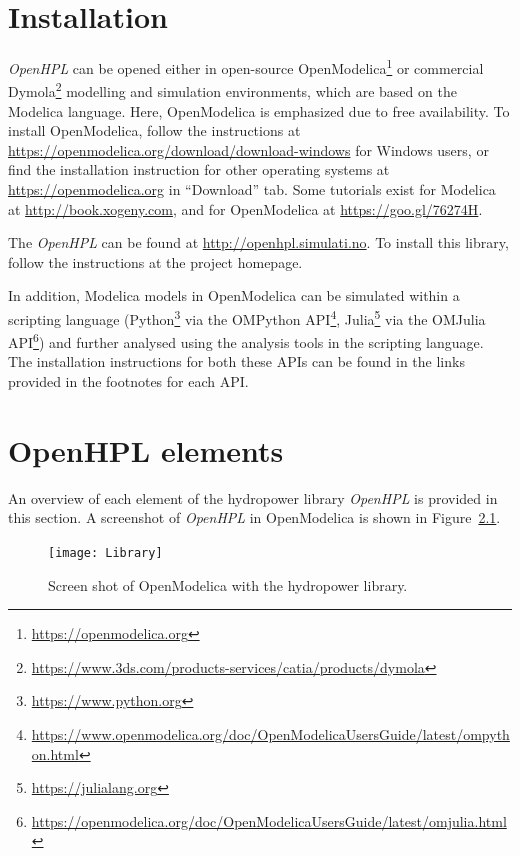 \documentclass[%
]{USN-PhD}
\begin{document}
\chapter{Installation}

\emph{OpenHPL} can be opened either in open-source OpenModelica\footnote{\url{https://openmodelica.org}} or commercial Dymola\footnote{\url{https://www.3ds.com/products-services/catia/products/dymola}} modelling and simulation environments, which are based on the Modelica language. Here, OpenModelica is emphasized due to free availability. To install OpenModelica, follow the instructions at \url{https://openmodelica.org/download/download-windows} for Windows users, or find the installation instruction for other operating systems at \url{https://openmodelica.org} in ``Download'' tab. Some tutorials exist for Modelica at \url{http://book.xogeny.com}, and for OpenModelica at \url{https://goo.gl/76274H}.

The \emph{OpenHPL} can be found at \url{http://openhpl.simulati.no}. To install this library, follow the instructions at the project homepage.

In addition, Modelica models in OpenModelica can be simulated within a scripting language (Python\footnote{\url{https://www.python.org}} via the OMPython API\footnote{\url{https://www.openmodelica.org/doc/OpenModelicaUsersGuide/latest/ompython.html}}, Julia\footnote{\url{https://julialang.org}} via the OMJulia API\footnote{\url{https://openmodelica.org/doc/OpenModelicaUsersGuide/latest/omjulia.html}}) and further analysed using the analysis tools in the scripting language. The installation instructions for both these APIs can be found in the links provided in the footnotes for each API.

\chapter{OpenHPL elements}

An overview of each element of the hydropower library \emph{OpenHPL} is provided in this section. A screenshot of \emph{OpenHPL} in OpenModelica is shown in Figure~\ref{fig:Library}.

\begin{figure}[!ht]
  \centering
 \texttt{[image: Library]}
 \caption{Screen shot of OpenModelica with the hydropower library.}
  \label{fig:Library}
\end{figure}
\end{document}

